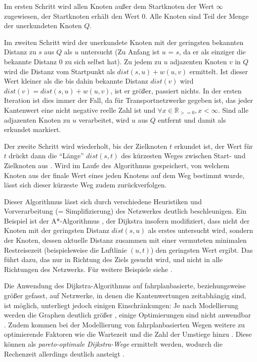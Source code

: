 \documentclass[11pt,pdftex,a4paper]{scrartcl}
\begin{document}
	Im ersten Schritt wird allen Knoten außer dem Startknoten der Wert $\infty$ zugewiesen, der Startknoten erhält den Wert $0$. Alle Knoten sind Teil der Menge der unerkundeten Knoten $Q$.
	
	Im zweiten Schritt wird der unerkundete Knoten mit der geringsten bekannten Distanz zu $s$ aus $Q$ als $u$ untersucht (Zu Anfang ist $u$ = $s$, da er als einziger die bekannte Distanz $0$ zu sich selbst hat). Zu jedem zu $u$ adjazenten Knoten $v$ in $Q$ wird die Distanz vom Startpunkt als $dist(s,u) + w(u,v)$ ermittelt. Ist dieser Wert kleiner als die bis dahin bekannte Distanz $dist(v)$ wird $dist(v)=dist(s,u)+w(u,v)$, ist er größer, passiert nichts. In der ersten Iteration ist dies immer der Fall, da für Transportnetzwerke gegeben ist, das jeder Kantenwert eine nicht negative reelle Zahl ist und $\forall x \in \mathbb {R} _{>=0}, x < \infty$. Sind alle adjazenten Knoten zu $u$ verarbeitet, wird $u$ aus $Q$ entfernt und damit als erkundet markiert. 
	
	Der zweite Schritt wird wiederholt, bis der Zielknoten $t$ erkundet ist, der Wert für $t$ drückt dann die \enquote{Länge} $dist(s,t)$ des kürzesten Weges zwischen Start- und Zielknoten aus \parencite[vgl.][3]{bastRoutePlanningTransportation2015}. Wird im Laufe des Algorithmus gespeichert, von welchem Knoten aus der finale Wert eines jeden Knotens auf dem Weg bestimmt wurde, lässt sich dieser kürzeste Weg zudem zurückverfolgen. 
	
	Dieser Algorithmus lässt sich durch verschiedene Heuristiken und Vorverarbeitung (= Simplifizierung) des Netzwerkes deutlich beschleunigen. Ein Beispiel ist der A*-Algorithmus \parencite{Hart1968AFB}, der Dijkstra insofern modifiziert, dass nicht der Knoten mit der geringsten Distanz $dist(s,u)$ als erstes untersucht wird, sondern der Knoten, dessen aktuelle Distanz zusammen mit einer vermuteten minimalen Restreisezeit (beispielsweise die Luftlinie $(u,t)$) den geringsten Wert ergibt. Das führt dazu, das nur in Richtung des Ziels gesucht wird, und nicht in alle Richtungen des Netzwerks. Für weitere Beispiele siehe \textcite[2.2--2.6]{bastRoutePlanningTransportation2015}.
	
	Die Anwendung des Dijkstra-Algorithmus auf fahrplanbasierte, beziehungsweise größer gefasst, auf Netzwerke, in denen die Kantenwertungen zeitabhängig sind, ist möglich, unterliegt jedoch einigen Einschränkungen: Je nach Modellierung werden die Graphen deutlich größer \parencite[30]{bastRoutePlanningTransportation2015}, einige Optimierungen sind nicht anwendbar \parencites[1]{dellingRoundBasedPublicTransit2012}[366]{bastCarPublicTransport2009}. Zudem kommen bei der Modellierung von fahrplanbasierten Wegen weitere zu optimierende Faktoren wie die Wartezeit und die Zahl der Umstiege hinzu \parencites[41]{kujalaTravelTimesTransfers2018}[544f]{conwayAccountingUncertaintyVariation2018}[29f]{bastRoutePlanningTransportation2015}. Diese können als \textit{pareto-optimale Dijkstra-Wege} ermittelt werden, wodurch die Rechenzeit allerdings deutlich ansteigt \parencite[1]{dellingRoundBasedPublicTransit2012}.
	
\end{document}
